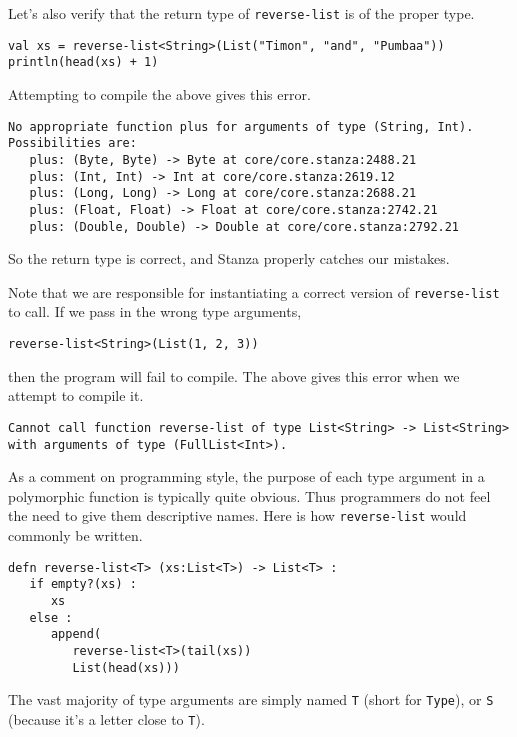 \documentclass[10pt,oneside]{book}
\begin{document}
Let's also verify that the return type of \texttt{\frenchspacing reverse-list} is of the proper type.
\begin{lstlisting}
val xs = reverse-list<String>(List("Timon", "and", "Pumbaa"))
println(head(xs) + 1)
\end{lstlisting} 
Attempting to compile the above gives this error.
\begin{lstlisting}
No appropriate function plus for arguments of type (String, Int). 
Possibilities are:
   plus: (Byte, Byte) -> Byte at core/core.stanza:2488.21
   plus: (Int, Int) -> Int at core/core.stanza:2619.12
   plus: (Long, Long) -> Long at core/core.stanza:2688.21
   plus: (Float, Float) -> Float at core/core.stanza:2742.21
   plus: (Double, Double) -> Double at core/core.stanza:2792.21
\end{lstlisting}
So the return type is correct, and Stanza properly catches our mistakes.

Note that we are responsible for instantiating a correct version of \texttt{\frenchspacing reverse-list} to call. If we pass in the wrong type arguments, 
\begin{lstlisting}
reverse-list<String>(List(1, 2, 3))
\end{lstlisting}
then the program will fail to compile. The above gives this error when we attempt to compile it.
\begin{lstlisting}
Cannot call function reverse-list of type List<String> -> List<String> 
with arguments of type (FullList<Int>).
\end{lstlisting}

As a comment on programming style, the purpose of each type argument in a polymorphic function is typically quite obvious. Thus programmers do not feel the need to give them descriptive names. Here is how \texttt{\frenchspacing reverse-list} would commonly be written.
\begin{lstlisting}
defn reverse-list<T> (xs:List<T>) -> List<T> :
   if empty?(xs) :
      xs
   else :
      append(
         reverse-list<T>(tail(xs))
         List(head(xs)))
\end{lstlisting}
The vast majority of type arguments are simply named \texttt{\frenchspacing T} (short for \texttt{\frenchspacing Type}), or \texttt{\frenchspacing S} (because it's a letter close to \texttt{\frenchspacing T}). 
\end{document}
